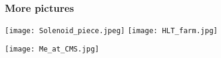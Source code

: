 \documentclass[9pt,aspectratio=169]{beamer}
\begin{document}
\begin{frame}
	\frametitle{More pictures}
	\begin{center}
		\texttt{[image: Solenoid\_piece.jpeg]}
		\texttt{[image: HLT\_farm.jpg]}
	\end{center}
\end{frame}
\begin{frame}
	\centering
	\texttt{[image: Me\_at\_CMS.jpg]}
\end{frame}
\end{document}
